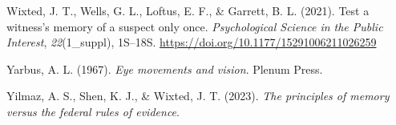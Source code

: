 \documentclass[
]{krantz}
\newlength{\cslhangindent}
\newenvironment{CSLReferences}[2] %
 {\begin{list}{}{%
  \setlength{\itemindent}{0pt}
  \setlength{\leftmargin}{0pt}
  \setlength{\parsep}{0pt}
  \ifodd #1
   \setlength{\leftmargin}{\cslhangindent}
   \setlength{\itemindent}{-1\cslhangindent}
  \fi
  \setlength{\itemsep}{#2\baselineskip}}}
 {\end{list}}
\begin{document}
\begin{CSLReferences}{1}{0}
Wixted, J. T., Wells, G. L., Loftus, E. F., \& Garrett, B. L. (2021). Test a witness's memory of a suspect only once. \emph{Psychological Science in the Public Interest}, \emph{22}(1\_suppl), 1S--18S. \url{https://doi.org/10.1177/15291006211026259}

Yarbus, A. L. (1967). \emph{Eye movements and vision}. Plenum Press.

Yilmaz, A. S., Shen, K. J., \& Wixted, J. T. (2023). \emph{The principles of memory versus the federal rules of evidence}.

\end{CSLReferences}
\end{document}
